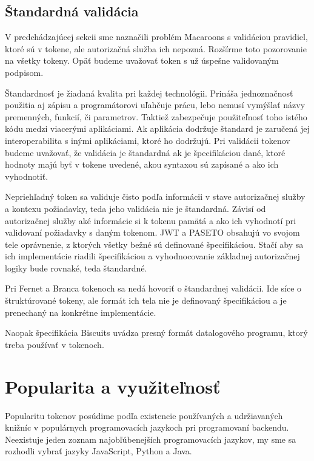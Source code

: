 \subsection{Štandardná validácia}

V predchádzajúcej sekcii sme naznačili problém Macaroons s validáciou pravidiel, ktoré sú v tokene, ale autorizačná služba ich nepozná. Rozšírme toto pozorovanie na všetky tokeny. Opäť budeme uvažovať token s už úspešne validovaným podpisom.

Štandardnosť je žiadaná kvalita pri každej technológii. Prináša jednoznačnosť použitia aj zápisu a programátorovi uľahčuje prácu, lebo nemusí vymýšlať názvy premenných, funkcií, či parametrov. Taktiež zabezpečuje použiteľnosť toho istého kódu medzi viacerými aplikáciami. Ak aplikácia dodržuje štandard je zaručená jej interoperabilita s inými aplikáciami, ktoré ho dodržujú. Pri validácii tokenov budeme uvažovať, že validácia je štandardná ak je špecifikáciou dané, ktoré hodnoty majú byť v tokene uvedené, akou syntaxou sú zapísané a ako ich vyhodnotiť.

Nepriehľadný token sa validuje čisto podľa informácii v stave autorizačnej služby a kontexu požiadavky, teda jeho validácia nie je štandardná. Závisí od autorizačnej služby aké informácie si k tokenu pamätá a ako ich vyhodnotí pri validovaní požiadavky s daným tokenom. JWT a PASETO obsahujú vo svojom tele oprávnenie, z ktorých všetky bežné sú definované špecifikáciou. Stačí aby sa ich implementácie riadili špecifikáciou a vyhodnocovanie základnej autorizačnej logiky bude rovnaké, teda štandardné.

Pri Fernet a Branca tokenoch sa nedá hovoriť o štandardnej validácii. Ide síce o štruktúrované tokeny, ale formát ich tela nie je definovaný špecifikáciou a je prenechaný na konkrétne implementácie.

Naopak špecifikácia Biscuits uvádza presný formát datalogového programu, ktorý treba používať v tokenoch.

\section{Popularita a využiteľnosť}

Popularitu tokenov posúdime podľa existencie používaných a udržiavaných knižníc v populárnych programovacích jazykoch pri programovaní backendu. Neexistuje jeden zoznam najobľúbenejších programovacích jazykov, my sme sa rozhodli vybrať jazyky JavaScript, Python a Java.


